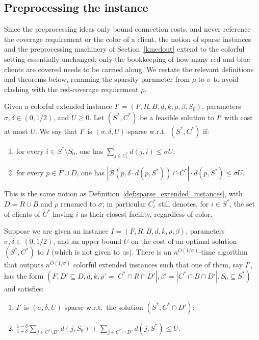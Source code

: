 \subsection{Preprocessing the instance}

Since the preprocessing ideas only bound connection costs, and never reference the coverage requirement or the color of a client, the notion of sparse instances and the preprocessing machinery of Section~\ref{kmedout} extend to the colorful setting essentially unchanged; only the bookkeeping of how many red and blue clients are covered needs to be carried along. We restate the relevant definitions and theorems below, renaming the sparsity parameter from $\rho$ to $\sigma$ to avoid clashing with the red-coverage requirement $\rho$.

\begin{definition}
    \label{def:sparse_extended_instances_col}
Given a colorful extended instance $I' = (F,R,B,d,k,\rho,\beta,S_0)$, parameters $\sigma, \delta \in (0, 1/2)$, and $U \ge 0$. Let $(S^*, C^*)$ be a feasible solution to $I'$ with cost at most $U$. We say that $I'$ is $(\sigma, \delta, U)$-sparse w.r.t.\ $(S^*, C^*)$ if:
\begin{enumerate}[label=\thedefinition\alph*)]
    \item \label{def:sparse_col_a} for every $i \in S^* \setminus S_0$, one has $\sum_{j \in C_i^*} d(j, i) \leq \sigma U$;
    \item \label{def:sparse_col_b} for every $p \in F \cup D$, one has $|\mathcal{B}(p, \delta \cdot d(p, S^*)) \cap C^*| \cdot d(p, S^*) \leq \sigma U$.
\end{enumerate}
\end{definition}

This is the same notion as Definition~\ref{def:sparse_extended_instances}, with $D = R \cup B$ and $\rho$ renamed to $\sigma$; in particular $C_i^*$ still denotes, for $i \in S^*$, the set of clients of $C^*$ having $i$ as their closest facility, regardless of color.

\begin{theorem}
\label{thm:sparsification_col}
Suppose we are given an instance $I = (F, R, B, d, k, \rho, \beta)$, parameters $\sigma, \delta \in (0, 1/2)$, and an upper bound $U$ on the cost of an optimal solution $(S^*, C^*)$ to $I$ (which is not given to us). There is an $n^{O(1/\sigma)}$-time algorithm that outputs $n^{O(1/\sigma)}$ colorful extended instances such that one of them, say $I'$, has the form $(F, D' \subseteq D, d, k, \rho' = |C^* \cap R \cap D'|, \beta' = |C^* \cap B \cap D'|, S_0 \subseteq S^*)$ and satisfies:
\begin{enumerate}[label=\thedefinition\alph*)]
    \item \label{thm:sparsification_col_a} $I'$ is $(\sigma, \delta, U)$-sparse w.r.t.\ the solution $(S^*, C^* \cap D')$;
    \item \label{thm:sparsification_col_b} $\frac{1-\delta}{1+\delta} \sum_{j \in C^* \setminus D'} d(j, S_0) + \sum_{j \in C^* \cap D'} d(j, S^*) \leq U$.
\end{enumerate}
\end{theorem}

